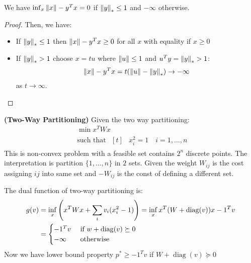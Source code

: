 \begin{proposition}
    We have $\inf_x\left\lVert x\right\rVert - y^Tx = 0$ if $\left\lVert y\right\rVert_*\le1$ and $-\infty$ otherwise.
\end{proposition}
\begin{proof}
    Then, we have:
    \begin{itemize}
        \item If $\left\lVert y\right\rVert_*\le1$ then $\left\lVert x\right\rVert-y^Tx\ge0$ for all $x$ with equality if $x\ge0$
        \item If $\left\lVert y\right\rVert_*>1$ choose $x=tu$ where $\left\lVert u\right\rVert\le1$ and $u^Ty = \left\lVert y\right\rVert_*>1$:
        \begin{equation*}
            \left\lVert x\right\rVert-y^Tx = t(\left\lVert u\right\rVert - \left\lVert y\right\rVert_*) \rightarrow -\infty
        \end{equation*} 
        as $t\rightarrow\infty$. 
    \end{itemize}
\end{proof}

\begin{definition}{\textbf{(Two-Way Partitioning)}} 
    Given the two way partitioning:
    \begin{equation*}
    \begin{aligned}
        &\min x^TWx \\
        &\text{such that } \begin{aligned}[t]
            &x^2_i=1 \quad i=1,\dots,n
        \end{aligned}
    \end{aligned}
    \end{equation*}
    This is non-convex problem with a feasible set contains $2^n$ discrete points. The interpretation is partition $\{ 1,\dots,n \}$ in $2$ sets. Given the weight $W_{ij}$ is the cost assigning $ij$ into same set and $-W_{ij}$ is the const of defining a different set.
\end{definition}

\begin{remark}
    The dual function of two-way partitioning is:
    \begin{equation*}
    \begin{aligned}
        g(v) &= \inf_x \left( x^TWx + \sum_i v_i(x^2_i-1) \right) = \inf_x x^T(W + \operatorname{diag}(v))x - 1^Tv \\
        &=\begin{cases}
            -1^Tv & \text{ if } w + \operatorname{diag}(v)\succeq0\\
            -\infty & \text{ otherwise }
        \end{cases}
    \end{aligned}
    \end{equation*}
    Now we have lower bound property $p^*\ge-1^Tv$ if $W+\operatorname{diag}(v)\succeq0$
\end{remark}

